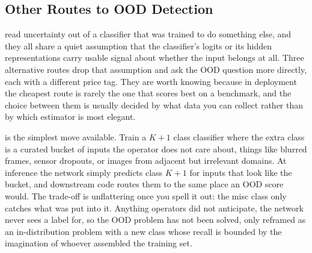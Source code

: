 

\subsection{Other Routes to OOD Detection}


 read uncertainty out of a classifier that was trained to do something else, and they all share a quiet assumption that the classifier's logits or its hidden representations carry usable signal about whether the input belongs at all.
Three alternative routes drop that assumption and ask the OOD question more directly, each with a different price tag.
They are worth knowing because in deployment the cheapest route is rarely the one that scores best on a benchmark, and the choice between them is usually decided by what data you can collect rather than by which estimator is most elegant.

\cite{Hendrycks2017Baseline} is the simplest move available.
Train a $K{+}1$ class classifier where the extra class is a curated bucket of inputs the operator does not care about, things like blurred frames, sensor dropouts, or images from adjacent but irrelevant domains.
At inference the network simply predicts class $K{+}1$ for inputs that look like the bucket, and downstream code routes them to the same place an OOD score would.
The trade-off is unflattering once you spell it out: the misc class only catches what was put into it.
Anything operators did not anticipate, the network never sees a label for, so the OOD problem has not been solved, only reframed as an in-distribution problem with a new class whose recall is bounded by the imagination of whoever assembled the training set.

